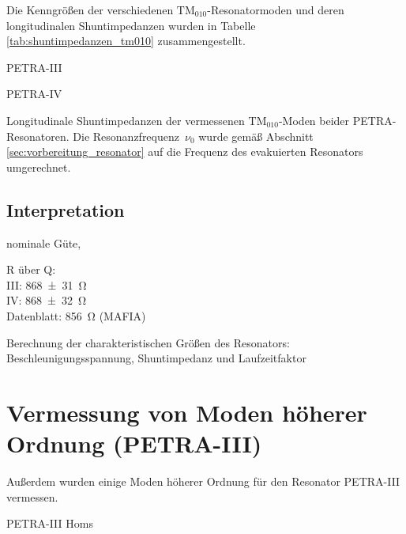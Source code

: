 Die Kenngrößen der verschiedenen $\mathrm{TM}_{010}$-Resonatormoden und deren longitudinalen Shuntimpedanzen wurden in Tabelle \ref{tab:shuntimpedanzen_tm010} zusammengestellt.
\begin{table}[htb]
	\begin{subtable}{1\textwidth}
		\centering
		
		\caption{PETRA-III}
	\end{subtable}
	\begin{subtable}{1\textwidth}
		\centering
		
		\caption{PETRA-IV}
	\end{subtable}
	\caption{Longitudinale Shuntimpedanzen der vermessenen $\mathrm{TM}_{010}$-Moden beider PETRA-Resonatoren. Die Resonanzfrequenz~$\nu_0$ wurde gemäß Abschnitt \ref{sec:vorbereitung_resonator} auf die Frequenz des evakuierten Resonators umgerechnet. }
	\label{tab:shuntimpedanzen_tm010}
\end{table}

\subsection{Interpretation}
nominale Güte, 




R über Q:\\
III: \SI{868+-31}{\ohm}\\
IV: \SI{868+-32}{\ohm}\\
Datenblatt: \SI{856}{\ohm} (MAFIA)

Berechnung der charakteristischen Größen des Resonators: Beschleunigungsspannung, Shuntimpedanz und Laufzeitfaktor




\section{Vermessung von Moden höherer Ordnung (PETRA-III)}
\label{sec:hom_messung}
Außerdem wurden einige Moden höherer Ordnung für den Resonator PETRA-III vermessen.

\begin{table}[htb]
	\centering
	
	\caption{PETRA-III Homs}
\end{table}

